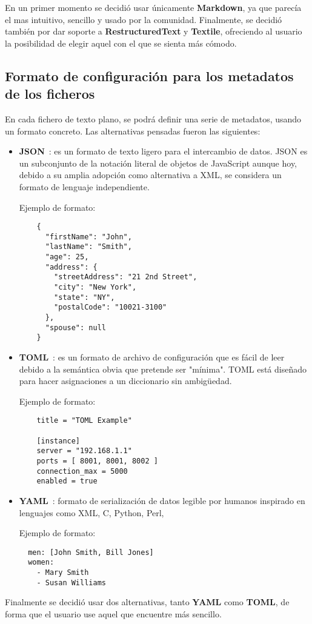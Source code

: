 En un primer momento se decidió usar únicamente \textbf{Markdown}, ya que parecía el mas intuitivo, sencillo y usado por la comunidad. Finalmente,
se decidió también por dar soporte a \textbf{RestructuredText} y \textbf{Textile}, ofreciendo al usuario la posibilidad de elegir aquel
con el que se sienta más cómodo.

\subsection{Formato de configuración para los metadatos de los ficheros}

En cada fichero de texto plano, se podrá definir una serie de metadatos, usando un formato concreto. Las alternativas pensadas fueron
las siguientes:

\begin{itemize}
\item \textbf{JSON}~\cite{json}: es un formato de texto ligero para el intercambio de datos. JSON es un subconjunto de la notación literal de
objetos de JavaScript aunque hoy, debido a su amplia adopción como alternativa a XML, se considera un formato de lenguaje independiente.

Ejemplo de formato:

\begin{verbatim}
    {
      "firstName": "John",
      "lastName": "Smith",
      "age": 25,
      "address": {
        "streetAddress": "21 2nd Street",
        "city": "New York",
        "state": "NY",
        "postalCode": "10021-3100"
      },
      "spouse": null
    }
\end{verbatim}

\item \textbf{TOML}~\cite{toml}: es un formato de archivo de configuración que es fácil de leer debido a la semántica obvia que pretende ser
"mínima". TOML está diseñado para hacer asignaciones a un diccionario sin ambigüedad.

Ejemplo de formato:

\begin{verbatim}
    title = "TOML Example"

    [instance]
    server = "192.168.1.1"
    ports = [ 8001, 8001, 8002 ]
    connection_max = 5000
    enabled = true
\end{verbatim}

\item \textbf{YAML}~\cite{yaml}: formato de serialización de datos legible por humanos inspirado en lenguajes como XML, C, Python, Perl,

Ejemplo de formato:

\begin{verbatim}
  men: [John Smith, Bill Jones]
  women:
    - Mary Smith
    - Susan Williams
\end{verbatim}

\end{itemize}


Finalmente se decidió usar dos alternativas, tanto \textbf{YAML} como \textbf{TOML}, de forma que el usuario use aquel que encuentre más
sencillo.
